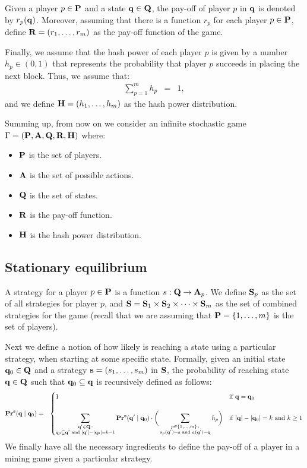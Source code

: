 Given a player $p \in \mathbf{P}$ and a state $\mathbf{q} \in \mathbf{Q}$, the pay-off of player $p$ in $\mathbf{q}$ is denoted by $r_p(\mathbf{q})$. Moreover, assuming that there is a  function $r_p$ for each player $p \in \mathbf{P}$, define $\mathbf{R} = (r_1, \ldots, r_m)$ as the pay-off function of the game.

Finally, we assume that the hash power of each player $p$ is given by a number $h_p \in (0,1)$ that represents the probability that player $p$ succeeds in placing the next block. Thus, we assume that:
\begin{eqnarray*}
\sum_{p=1}^m h_p & = &  1, 
\end{eqnarray*}and we define $\mathbf{H} = (h_1, \ldots, h_m)$ as the hash power distribution.


Summing up, from now on we consider an infinite stochastic game $\Gamma = (\mathbf{P},\mathbf{A},\mathbf{Q},\mathbf{R},\mathbf{H})$ where:
\begin{itemize}
	\item $\mathbf{P}$ is the set of players.
	\item $\mathbf{A}$ is the set of possible actions.
	\item $\mathbf{Q}$ is the set of states.
	\item $\mathbf{R}$ is the pay-off function.
	\item $\mathbf{H}$ is the hash power distribution.
\end{itemize} 


\subsection{Stationary equilibrium}
A strategy for a player $p \in \mathbf{P}$ is a function $s : \mathbf{Q} \rightarrow \mathbf{A}_p$. 
We define $\mathbf{S}_p$ as the set of all strategies for player $p$, and $\mathbf{S} = \mathbf{S}_{1} \times \mathbf{S}_{2} \times \cdots \times \mathbf{S}_{m}$ as the set of combined strategies for the game (recall that we are assuming that $\mathbf{P} = \{1, \ldots, m\}$ is the set of players). 

Next we define a notion of how likely is reaching a state using a particular strategy, when starting at some specific state. Formally, given an initial state $\mathbf{q}_0 \in \mathbf{Q}$ and a strategy $\mathbf{s} = (s_1, \ldots, s_m)$ in $\mathbf{S}$, 
the probability of reaching state $\mathbf{q} \in \mathbf{Q}$ such that $\mathbf{q}_0 \subseteq \mathbf{q}$ is recursively defined as follows:
\begin{eqnarray*}
\mathbf{Pr}^{\mathbf{s}}(\mathbf{q} \mid \mathbf{q}_0) & = &
\begin{cases}
1 & \text{if } \mathbf{q} =  \mathbf{q}_0\\
& \\
{\displaystyle \sum_{\substack{\mathbf{q}' \in \mathbf{Q} \,:\\ \mathbf{q}_0 \subseteq \mathbf{q}' \text{ and } |\mathbf{q}'| - |\mathbf{q}_0| = k-1}} \mathbf{Pr}^{\mathbf{s}}(\mathbf{q}' \mid \mathbf{q}_0) \cdot \bigg(\sum_{\substack{p \in \{1, \ldots, m\} \,: \\ s_p(\mathbf{q}') = a \text{ and } a(\mathbf{q}') = \mathbf{q}}} h_p\bigg)}
 & \text{if } |\mathbf{q}| - |\mathbf{q}_0| = k \text{ and } k \geq 1
\end{cases}
\end{eqnarray*}
We finally have all the necessary ingredients to define the pay-off of a player in a mining game given a particular strategy.

